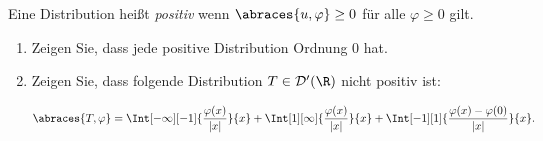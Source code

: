 
\begin{exercise}

Eine Distribution heißt \textit{positiv} wenn $\abraces{u, \varphi} \geq 0$ für alle $\varphi \geq 0$ gilt.

\begin{enumerate}[label = (\roman*)]
    \item Zeigen Sie, dass jede positive Distribution Ordnung $0$ hat.
    \item Zeigen Sie, dass folgende Distribution $T \in \mathcal{D}^\prime(\R)$ nicht positiv ist:
    
    \begin{align*}
        \abraces{T, \varphi}
        =
        \Int[-\infty][-1]
        {
            \frac{\varphi(x)}{|x|}
        }{x}
        +
        \Int[1][\infty]
        {
            \frac{\varphi(x)}{|x|}
        }{x}
        +
        \Int[-1][1]
        {
            \frac{\varphi(x) - \varphi(0)}{|x|}
        }{x}.
    \end{align*}

\end{enumerate}

\end{exercise}


